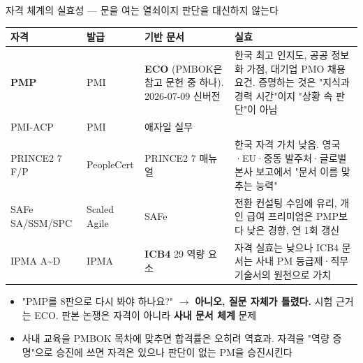 \begin{frame}[allowframebreaks=1.0]{자격 체계의 실효성 — 문을 여는 열쇠이지 판단을 대신하지 않는다}
\small
{\footnotesize\setlength{\tabcolsep}{3pt}\renewcommand{\arraystretch}{1.12}
\begin{tabular}{@{}>{\raggedright\arraybackslash}p{}>{\raggedright\arraybackslash}p{}>{\raggedright\arraybackslash}p{}>{\raggedright\arraybackslash}p{}@{}}
\toprule
\textbf{자격} & \textbf{발급} & \textbf{기반 문서} & \textbf{실효} \\
\midrule
\textbf{PMP} & PMI & \textbf{ECO} (PMBOK은 참고 문헌 중 하나). 2026-07-09 신버전 & 한국 최고 인지도, 공공 정보화 가점, 대기업 PMO 채용 요건. 증명하는 것은 "지식과 경력 시간"이지 "상황 속 판단"이 아님 \\
PMI-ACP & PMI & 애자일 실무 &  \\
PRINCE2 7 F/P & PeopleCert & PRINCE2 7 매뉴얼 & 한국 자격 가치 낮음. 영국·EU·중동 발주처·글로벌 본사 보고에서 "문서 이름 맞추는 능력" \\
SAFe SA/SSM/SPC & Scaled Agile & SAFe & 전환 컨설팅 수임에 유리, 개인 급여 프리미엄은 PMP보다 낮은 경향, 연 1회 갱신 \\
IPMA A\textasciitilde{}D & IPMA & \textbf{ICB4} 29 역량 요소 & 자격 실효는 낮으나 ICB4 문서는 사내 PM 등급제·직무기술서의 원천으로 가치 \\
\bottomrule
\end{tabular}}
\par\smallskip
\begin{itemize}
\item\relax "PMP를 8판으로 다시 봐야 하나요?" $\rightarrow$ \textbf{아니오, 질문 자체가 틀렸다.} 시험 근거는 ECO. 판본 논쟁은 자격이 아니라 \textbf{사내 문서 체계} 문제
\item\relax 사내 교육을 PMBOK 목차에 맞추면 합격률은 오히려 역효과. 자격을 "역량 증명"으로 승진에 쓰면 자격은 있으나 판단이 없는 PM을 승진시킨다
\end{itemize}
\end{frame}

